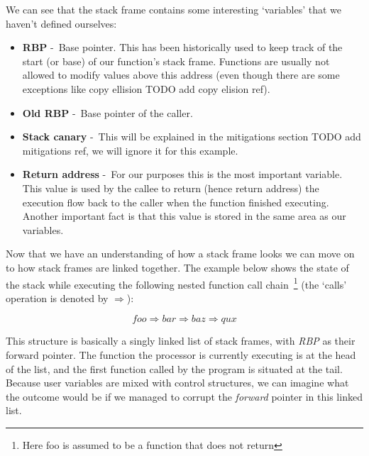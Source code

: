 \documentclass{article}
\begin{document}
We can see that the stack frame contains some interesting `variables' that we
haven't defined ourselves:
\begin{itemize}
  \item \textbf{RBP} -~Base pointer. This has been historically used to keep
        track of the start (or base) of our function's stack frame. Functions are usually not allowed to modify values above this address (even though there are some exceptions like copy ellision TODO add copy elision ref).
  \item \textbf{Old RBP} -~Base pointer of the caller.
  \item \textbf{Stack canary} -~This will be explained in the mitigations section TODO add mitigations ref, we will ignore it for this example.
  \item \textbf{Return address} -~For our purposes this is the most important variable. This value is used by the callee to return (hence return address) the execution flow back to the caller when the function finished executing. Another important fact is that this value is stored in the same area as our variables.
\end{itemize}

Now that we have an understanding of how a stack frame looks we can move on to
how stack frames are linked together. The example below shows the state of the
stack while executing the following nested function call chain~\footnote{Here foo is assumed to be a function that does not return} (the
`calls' operation is denoted by $\Rightarrow$):

\begin{equation}
  foo \Rightarrow bar \Rightarrow baz \Rightarrow qux
\end{equation}

This structure is basically a singly linked list of stack frames, with \emph{RBP} as their forward pointer. The function the processor is currently executing is at the head of the list, and the first function called by the program is situated at the tail. Because user variables are mixed with control structures, we can imagine what the outcome would be if we managed to corrupt the \emph{forward} pointer in this linked list.
\end{document}
